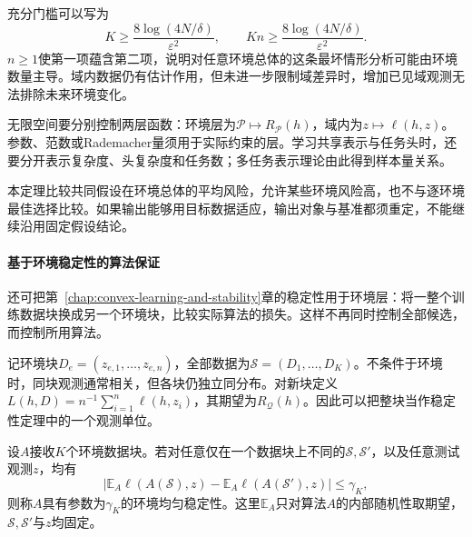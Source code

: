 充分门槛可以写为
\[
 K\geq\frac{8\log(4N/\delta)}{\varepsilon^2},\qquad
 Kn\geq\frac{8\log(4N/\delta)}{\varepsilon^2}.
\]
$n\geq1$使第一项蕴含第二项，说明对任意环境总体的这条最坏情形分析可能由环境数量主导。域内数据仍有估计作用，但未进一步限制域差异时，增加已见域观测无法排除未来环境变化。

无限空间要分别控制两层函数：环境层为$\mathcal P\mapsto R_{\mathcal P}(h)$，域内为$z\mapsto\ell(h,z)$。参数、范数或Rademacher量须用于实际约束的层。学习共享表示与任务头时，还要分开表示复杂度、头复杂度和任务数；多任务表示理论由此得到样本量关系。

本定理比较共同假设在环境总体的平均风险，允许某些环境风险高，也不与逐环境最佳选择比较。如果输出能够用目标数据适应，输出对象与基准都须重定，不能继续沿用固定假设结论。

\paragraph{基于环境稳定性的算法保证}
\label{sec:dg-environment-stability}

还可把第~\ref{chap:convex-learning-and-stability}章的稳定性用于环境层：将一整个训练数据块换成另一个环境块，比较实际算法的损失。这样不再同时控制全部候选，而控制所用算法。

记环境块$D_e=(z_{e,1},\ldots,z_{e,n})$，全部数据为$\mathcal S=(D_1,\ldots,D_K)$。不条件于环境时，同块观测通常相关，但各块仍独立同分布。对新块定义$L(h,D)=n^{-1}\sum_{i=1}^n\ell(h,z_i)$，其期望为$R_{\mathcal Q}(h)$。因此可以把整块当作稳定性定理中的一个观测单位。

\begin{definition}[环境均匀稳定性]
\label{def:environment-stability}
设$A$接收$K$个环境数据块。若对任意仅在一个数据块上不同的$\mathcal S,\mathcal S'$，以及任意测试观测$z$，均有
\[
 \left|\mathbb E_A\ell(A(\mathcal S),z)
       -\mathbb E_A\ell(A(\mathcal S'),z)\right|\leq\gamma_K,
\]
则称$A$具有参数为$\gamma_K$的环境均匀稳定性。这里$\mathbb E_A$只对算法$A$的内部随机性取期望，$\mathcal S,\mathcal S'$与$z$均固定。
\end{definition}

